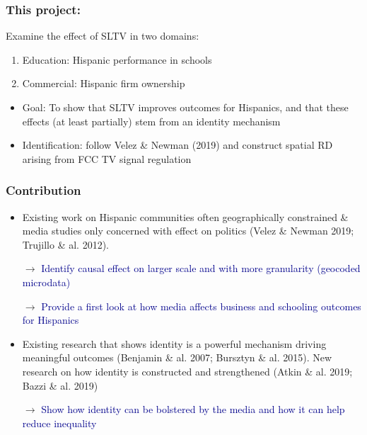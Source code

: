 \documentclass{beamer}
\begin{document}
\begin{frame}
\frametitle{This project:}

Examine the effect of SLTV in two domains:
\begin{enumerate}
\item Education: Hispanic performance in schools
\item Commercial: Hispanic firm ownership
\end{enumerate}

\begin{itemize}
\item Goal: To show that SLTV improves outcomes for Hispanics, and that these effects (at least partially) stem from an identity mechanism

\pause

\item Identification: follow Velez \& Newman (2019) and construct spatial RD arising from FCC TV signal regulation
\end{itemize}

\end{frame}


\begin{frame}
\frametitle{Contribution}
\begin{itemize}

\item Existing work on Hispanic communities often geographically constrained \& media studies only concerned with effect on politics  {\footnotesize (Velez \& Newman 2019; Trujillo \& al. 2012)}. 
\item[$\rightarrow $] \textcolor{darkblue}{Identify causal effect on larger scale and with more granularity (geocoded microdata)}

\item[$\rightarrow $] \textcolor{darkblue}{Provide a first look at how media affects business and schooling outcomes for Hispanics}

\item Existing research that shows identity is a powerful mechanism driving meaningful outcomes {\footnotesize (Benjamin \& al. 2007; Bursztyn \& al. 2015)}. New research on how identity is constructed and strengthened {\footnotesize (Atkin \& al. 2019; Bazzi \& al. 2019)}

\item[$\rightarrow $] \textcolor{darkblue}{Show how identity can be bolstered by the media and how it can help reduce inequality}

\end{itemize}

\end{frame}
\end{document}
